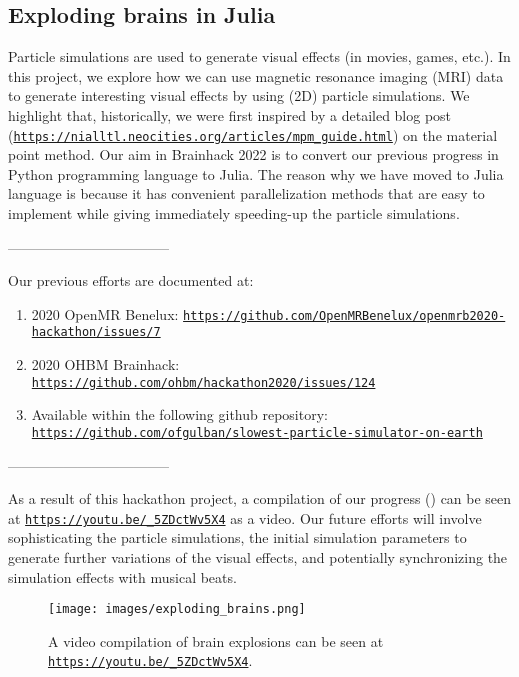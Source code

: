 \documentclass[../main.tex]{subfiles}
\begin{document}
\subsection{Exploding brains in Julia}\label{sec:explodingbrains}


Particle simulations are used to generate visual effects (in movies, games, etc.). In this project, we explore how we can use magnetic resonance imaging (MRI) data to generate interesting visual effects by using (2D) particle simulations. We highlight that, historically, we were first inspired by a detailed blog post (\texttt{\url{https://nialltl.neocities.org/articles/mpm_guide.html}}) on the material point method\citep{Jiang1965, Love2006, Stomakhin2013a}. Our aim in Brainhack 2022 is to convert our previous progress in Python programming language to Julia. The reason why we have moved to Julia language is because it has convenient parallelization methods that are easy to implement while giving immediately speeding-up the particle simulations.

-----------------------------------

Our previous efforts are documented at:
\begin{enumerate}
    \item 2020 OpenMR Benelux: \texttt{\url{https://github.com/OpenMRBenelux/openmrb2020-hackathon/issues/7}} 
    \item 2020 OHBM Brainhack: \texttt{\url{https://github.com/ohbm/hackathon2020/issues/124}}
    \item Available within the following github repository: \texttt{\url{https://github.com/ofgulban/slowest-particle-simulator-on-earth}}    
\end{enumerate}

-----------------------------------

As a result of this hackathon project, a compilation of our progress () can be seen at \texttt{\url{https://youtu.be/_5ZDctWv5X4}} as a video. Our future efforts will involve sophisticating the particle simulations, the initial simulation parameters to generate further variations of the visual effects, and potentially synchronizing the simulation effects with musical beats.

\begin{figure}
	\centering
	\texttt{[image: images/exploding\_brains.png]}
	\caption{A video compilation of brain explosions can be seen at \texttt{\url{https://youtu.be/_5ZDctWv5X4}}.}
	\label{fig:exploding_brains}
\end{figure}
\end{document}
